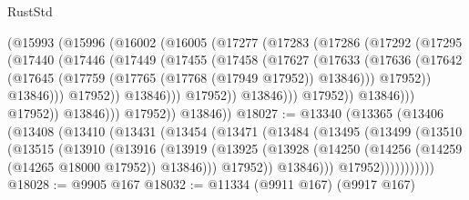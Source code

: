 \begin{lexlean}{RustStd}
\begin{coremodule}
                          (@15993
                            (@15996
                              (@16002
                                (@16005
                                  (@17277
                                    (@17283
                                      (@17286
                                        (@17292
                                          (@17295
                                            (@17440
                                              (@17446
                                                (@17449
                                                  (@17455
                                                    (@17458
                                                      (@17627
                                                        (@17633
                                                          (@17636
                                                            (@17642
                                                              (@17645
                                                                (@17759
                                                                  (@17765
                                                                    (@17768 (@17949 @17952))
                                                                    @13846)))
                                                              @17952))
                                                          @13846)))
                                                    @17952))
                                                @13846)))
                                          @17952))
                                      @13846)))
                                @17952))
                            @13846)))
                      @17952))
                  @13846)))
            @17952))
        @13846))
@18027 := @13340
    (@13365
      (@13406
        (@13408
          (@13410
            (@13431
              (@13454
                (@13471
                  (@13484
                    (@13495
                      (@13499
                        (@13510
                          (@13515
                            (@13910
                              (@13916
                                (@13919
                                  (@13925
                                    (@13928
                                      (@14250 (@14256 (@14259 (@14265 @18000 @17952)) @13846)))
                                    @17952))
                                @13846)))
                          @17952)))))))))))
@18028 := @9905 @167
@18032 := @11334 (@9911 @167) (@9917 @167)

\end{coremodule}
\end{lexlean}
